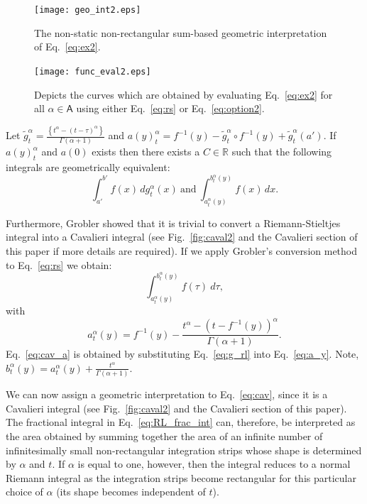 \documentclass[twoside,reqno,11pt]{fcaa-var} %
\begin{document}
\begin{figure}[htb]
\centering
\texttt{[image: geo\_int2.eps]}
\caption{The non-static non-rectangular sum-based geometric interpretation of Eq.~\eqref{eq:ex2}.}
\label{fig:geo2}
\end{figure}

\begin{figure}[htb]
\centering
\texttt{[image: func\_eval2.eps]}
\caption{Depicts the curves which are obtained by evaluating Eq.~\eqref{eq:ex2} for all $\alpha\in \mathsf{A}$ using either Eq.~\eqref{eq:rs} or Eq.~\eqref{eq:option2}.}
\label{fig:eval2}
\end{figure}






\begin{theorem}
Let $\widetilde{g}_t^{\alpha}=\frac{\left \{t^{\alpha} - (t-\tau)^{\alpha} \right \}}{\Gamma(\alpha+1)}$ and $a(y)_{t}^{\alpha} = f^{-1}(y) - \widetilde{g}_t^{\alpha}\circ f^{-1}(y) + \widetilde{g}_t^{\alpha}(a')$. If $a(y)_t^{\alpha}$ and $a(0)$ exists then  
there exists a $C\in \mathbb{R}$ such that the following integrals are geometrically equivalent:
\begin{equation}
\int_{a'}^{b'} f(x)\,dg_t^{\alpha}(x)~\textrm{and}~\int_{a_t^{\alpha}(y)}^{b_t^{\alpha}(y)} f(x)\,dx. 
\end{equation}
\end{theorem}





\noindent
Furthermore, Grobler showed that it is trivial to convert a Riemann-Stieltjes integral into a Cavalieri integral \cite{ackermann12,grobler19} (see Fig.~\ref{fig:caval2} and the Cavalieri section of this paper if more details are required). If we apply Grobler's conversion method to Eq.~\eqref{eq:rs} we obtain:
\begin{equation}
\label{eq:cav}
\int_{a_t^{\alpha}(y)}^{b_t^{\alpha}(y)} f(\tau)~d\tau, 
\end{equation}
with
\begin{equation}
\label{eq:cav_a}
a_t^{\alpha}(y) = f^{-1}(y) - \frac{t^{\alpha}-(t-f^{-1}(y))^{\alpha}}{\Gamma(\alpha+1)}.
\end{equation}
Eq.~\eqref{eq:cav_a} is obtained by substituting Eq.~\eqref{eq:g_rl} into Eq.~\eqref{eq:a_y}. Note, $b_t^{\alpha}(y) = a_t^{\alpha}(y) + \frac{t^{\alpha}}{\Gamma(\alpha+1)}$. 

\noindent
We can now assign a geometric interpretation to Eq.~\eqref{eq:cav}, since it is a Cavalieri integral (see Fig.~\ref{fig:caval2} and the Cavalieri section of this paper). The fractional integral in Eq.~\eqref{eq:RL_frac_int} can, therefore, be interpreted as the area obtained 
by summing together the area of an infinite number of infinitesimally small non-rectangular integration strips whose shape is determined by $\alpha$ and $t$. If $\alpha$ is equal to one, however, then the integral reduces to a normal Riemann integral as the integration strips become rectangular for this particular choice of $\alpha$ (its shape becomes independent of $t$).\\
\end{document}
